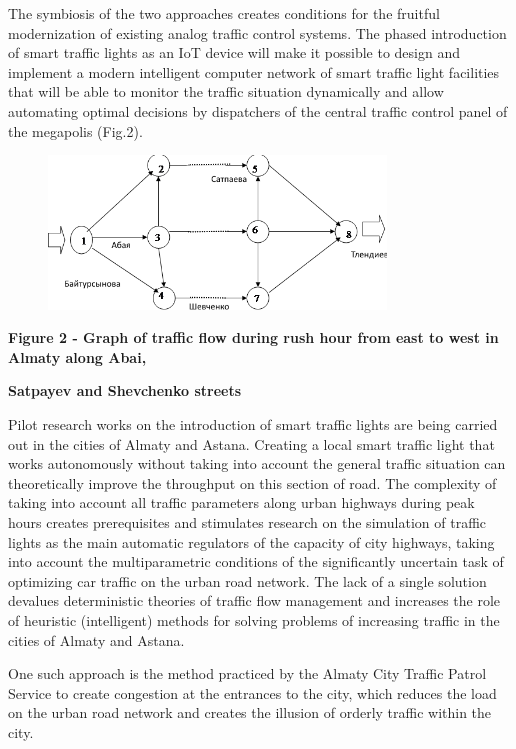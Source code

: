 The symbiosis of the two approaches creates conditions for the fruitful
modernization of existing analog traffic control systems. The phased
introduction of smart traffic lights as an IoT device will make it
possible to design and implement a modern intelligent computer network
of smart traffic light facilities that will be able to monitor the
traffic situation dynamically and allow automating optimal decisions by
dispatchers of the central traffic control panel of the megapolis
(Fig.2).

\begin{figure}[H]
	\centering
	\includegraphics[width=0.8\textwidth]{assets/74}
	\caption*{}
\end{figure}

\textbf{Figure 2 - Graph of traffic flow during rush hour from east to
west in Almaty along Abai,}

\textbf{Satpayev and Shevchenko streets}

Pilot research works on the introduction of smart traffic lights are
being carried out in the cities of Almaty and Astana. Creating a local
smart traffic light that works autonomously without taking into account
the general traffic situation can theoretically improve the throughput
on this section of road. The complexity of taking into account all
traffic parameters along urban highways during peak hours creates
prerequisites and stimulates research on the simulation of traffic
lights as the main automatic regulators of the capacity of city
highways, taking into account the multiparametric conditions of the
significantly uncertain task of optimizing car traffic on the urban road
network. The lack of a single solution devalues deterministic theories
of traffic flow management and increases the role of heuristic
(intelligent) methods for solving problems of increasing traffic in the
cities of Almaty and Astana.

One such approach is the method practiced by the Almaty City Traffic
Patrol Service to create congestion at the entrances to the city, which
reduces the load on the urban road network and creates the illusion of
orderly traffic within the city.

